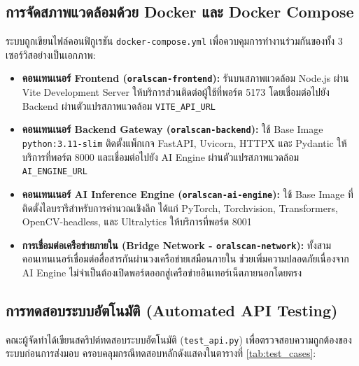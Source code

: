 \subsection{การจัดสภาพแวดล้อมด้วย Docker และ Docker Compose}
ระบบถูกเขียนไฟล์คอนฟิกูเรชัน \texttt{docker-compose.yml} เพื่อควบคุมการทำงานร่วมกันของทั้ง 3 เซอร์วิสอย่างเป็นเอกภาพ:
\begin{itemize}
    \item \textbf{คอนเทนเนอร์ Frontend (\texttt{oralscan-frontend}):} รันบนสภาพแวดล้อม Node.js ผ่าน Vite Development Server ให้บริการส่วนติดต่อผู้ใช้ที่พอร์ต 5173 โดยเชื่อมต่อไปยัง Backend ผ่านตัวแปรสภาพแวดล้อม \texttt{VITE\_API\_URL}
    \item \textbf{คอนเทนเนอร์ Backend Gateway (\texttt{oralscan-backend}):} ใช้ Base Image \texttt{python:3.11-slim} ติดตั้งแพ็กเกจ FastAPI, Uvicorn, HTTPX และ Pydantic ให้บริการที่พอร์ต 8000 และเชื่อมต่อไปยัง AI Engine ผ่านตัวแปรสภาพแวดล้อม \texttt{AI\_ENGINE\_URL}
    \item \textbf{คอนเทนเนอร์ AI Inference Engine (\texttt{oralscan-ai-engine}):} ใช้ Base Image ที่ติดตั้งไลบรารีสำหรับการคำนวณเชิงลึก ได้แก่ PyTorch, Torchvision, Transformers, OpenCV-headless, และ Ultralytics ให้บริการที่พอร์ต 8001
    \item \textbf{การเชื่อมต่อเครือข่ายภายใน (Bridge Network - \texttt{oralscan-network}):} ทั้งสามคอนเทนเนอร์เชื่อมต่อสื่อสารกันผ่านวงเครือข่ายเสมือนภายใน ช่วยเพิ่มความปลอดภัยเนื่องจาก AI Engine ไม่จำเป็นต้องเปิดพอร์ตออกสู่เครือข่ายอินเทอร์เน็ตภายนอกโดยตรง
\end{itemize}

\subsection{การทดสอบระบบอัตโนมัติ (Automated API Testing)}
คณะผู้จัดทำได้เขียนสคริปต์ทดสอบระบบอัตโนมัติ (\texttt{test\_api.py}) เพื่อตรวจสอบความถูกต้องของระบบก่อนการส่งมอบ ครอบคลุมกรณีทดสอบหลักดังแสดงในตารางที่ \ref{tab:test_cases}:

